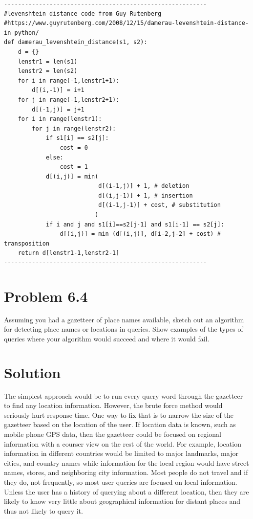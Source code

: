 \documentclass[letterpaper,12pt]{article}
\begin{document}
\begin{lstlisting}[breaklines]
----------------------------------------------------------
#levenshtein distance code from Guy Rutenberg
#https://www.guyrutenberg.com/2008/12/15/damerau-levenshtein-distance-in-python/
def damerau_levenshtein_distance(s1, s2):
    d = {}
    lenstr1 = len(s1)
    lenstr2 = len(s2)
    for i in range(-1,lenstr1+1):
        d[(i,-1)] = i+1
    for j in range(-1,lenstr2+1):
        d[(-1,j)] = j+1
    for i in range(lenstr1):
        for j in range(lenstr2):
            if s1[i] == s2[j]:
                cost = 0
            else:
                cost = 1
            d[(i,j)] = min(
                           d[(i-1,j)] + 1, # deletion
                           d[(i,j-1)] + 1, # insertion
                           d[(i-1,j-1)] + cost, # substitution
                          )
            if i and j and s1[i]==s2[j-1] and s1[i-1] == s2[j]:
                d[(i,j)] = min (d[(i,j)], d[i-2,j-2] + cost) # transposition
    return d[lenstr1-1,lenstr2-1]
----------------------------------------------------------
\end{lstlisting}

\pagebreak

\section{Problem 6.4}

Assuming you had a gazetteer of place names available, sketch out an algorithm for detecting place names or locations in queries. Show examples of the types of queries where your algorithm would succeed and where it would fail.

\section{Solution}

The simplest approach would be to run every query word through the gazetteer to find any location information. However, the brute force method would seriously hurt response time. One way to fix that is to narrow the size of the gazetteer based on the location of the user. If location data is known, such as mobile phone GPS data, then the gazetteer could be focused on regional information with a courser view on the rest of the world. For example, location information in different countries would be limited to major landmarks, major cities, and country names while information for the local region would have street names, stores, and neighboring city information. Most people do not travel and if they do, not frequently, so most user queries are focused on local information. Unless the user has a history of querying about a different location, then they are likely to know very little about geographical information for distant places and thus not likely to query it.
\end{document}

